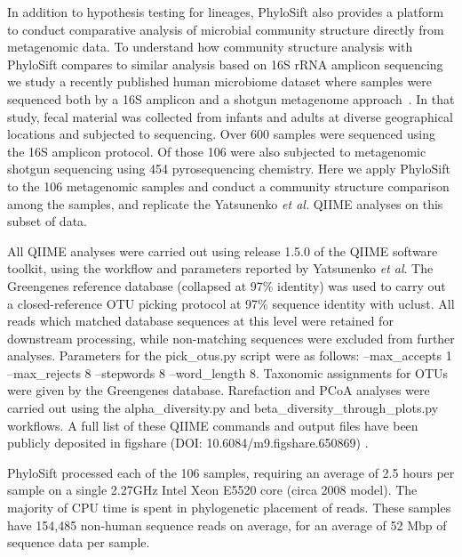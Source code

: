 \documentclass[10pt]{article}
\begin{document}
In addition to hypothesis testing for lineages, PhyloSift also provides a platform to conduct comparative analysis of microbial community structure directly from metagenomic data.
To understand how community structure analysis with PhyloSift compares to similar analysis based on 16S rRNA amplicon sequencing we study a recently published human microbiome dataset where samples were sequenced both by a 16S amplicon and a shotgun metagenome approach~\cite{Yatsunenko2012}.
In that study, fecal material was collected from infants and adults at diverse geographical locations and subjected to sequencing.
Over 600 samples were sequenced using the 16S amplicon protocol.
Of those 106 were also subjected to metagenomic shotgun sequencing using 454 pyrosequencing chemistry.
Here we apply PhyloSift to the 106 metagenomic samples and conduct a community structure comparison among the samples, and replicate the Yatsunenko \textit{et al.} QIIME analyses on this subset of data.

All QIIME analyses were carried out using release 1.5.0 of the QIIME software toolkit, using the workflow and parameters reported by Yatsunenko \textit{et al}. The Greengenes reference database (collapsed at 97\% identity) was used to carry out a closed-reference OTU picking protocol at 97\% sequence identity with uclust. All reads which matched database sequences at this level were retained for downstream processing, while non-matching sequences were excluded from further analyses. Parameters for the pick\_otus.py script were as follows: --max\_accepts 1 --max\_rejects 8 --stepwords 8 --word\_length 8. Taxonomic assignments for OTUs were given by the Greengenes database. Rarefaction and PCoA analyses were carried out using the alpha\_diversity.py and beta\_diversity\_through\_plots.py workflows. A full list of these QIIME commands and output files have been publicly deposited in figshare (DOI: 10.6084/m9.figshare.650869) .

PhyloSift processed each of the 106 samples, requiring an average of 2.5 hours per sample on a single 2.27GHz Intel Xeon E5520 core (circa 2008 model).
The majority of CPU time is spent in phylogenetic placement of reads.
These samples have 154,485 non-human sequence reads on average, for an average of 52 Mbp of sequence data per sample.
\end{document}

